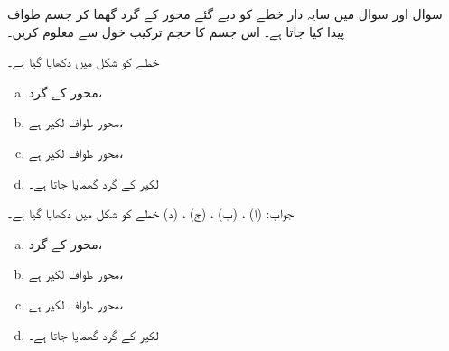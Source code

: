 سوال  اور سوال  میں سایہ دار خطے کو  دیے گئے محور کے گرد گھما کر جسم طواف پیدا کیا جاتا ہے۔ اس جسم کا حجم ترکیب خول سے معلوم کریں۔ 

خطے کو شکل  میں دکھایا گیا ہے۔
\begin{enumerate}[a.]
\item
محور  کے گرد،
\item
محور طواف لکیر  ہے،
\item
محور طواف لکیر  ہے،
\item
لکیر  کے گرد گھمایا جاتا ہے۔
\end{enumerate}
جواب:\quad
(ا) ، (ب) ، (ج) ، (د) 
خطے کو شکل  میں دکھایا گیا ہے۔
\begin{enumerate}[a.]
\item
محور  کے گرد،
\item
محور طواف لکیر  ہے،
\item
محور طواف لکیر  ہے،
\item
لکیر  کے گرد گھمایا جاتا ہے۔
\end{enumerate}
